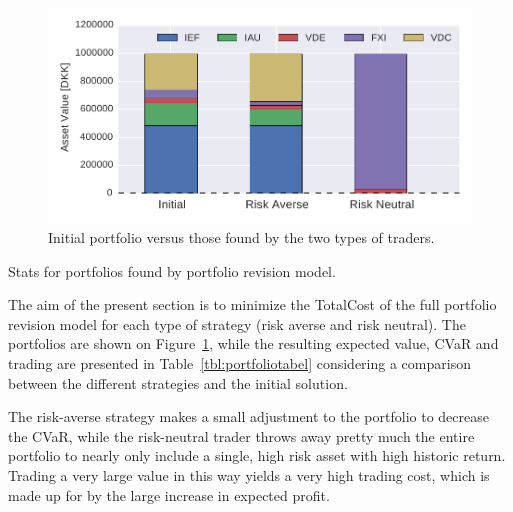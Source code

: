 \begin{figure}[tp]
\centering
\includegraphics{../pic/portfoliorevision_portfolio.pdf}
\caption{Initial portfolio versus those found by the two types of traders.}
\label{fig:prevpf}
\end{figure}

\begin{table}
\caption{Stats for portfolios found by portfolio revision model.}\label{tbl:portfoliotabel}
\centering

\end{table}

The aim of the present section is to minimize the TotalCost of the full portfolio revision model for each type of strategy (risk averse and risk neutral).
The portfolios are shown on Figure~\ref{fig:prevpf}, while the resulting expected value, CVaR and trading are presented in Table~\ref{tbl:portfoliotabel} considering a comparison between the different strategies and the initial solution. 

The risk-averse strategy makes a small adjustment to the portfolio to decrease the CVaR, while the risk-neutral trader throws away pretty much the entire portfolio to nearly only include a single, high risk asset with high historic return.
Trading a very large value in this way yields a very high trading cost, which is made up for by the large increase in expected profit.
